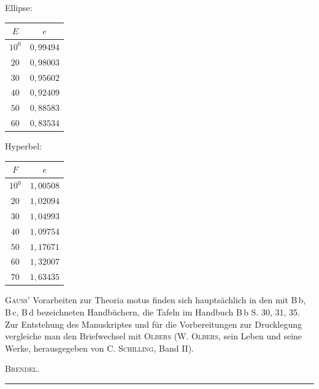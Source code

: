 \begin{center}
\begin{minipage}[t]{.42\linewidth}\centering
Ellipse:\par\smallskip
\begin{tabular}{c|c}
$E$ & $e$ \\
\hline
$10^0$ & $0{,}99494$ \\
$20$ & $0{,}98003$ \\
$30$ & $0{,}95602$ \\
$40$ & $0{,}92409$ \\
$50$ & $0{,}88583$ \\
$60$ & $0{,}83534$ \\
\end{tabular}
\end{minipage}\hfill
\begin{minipage}[t]{.42\linewidth}\centering
Hyperbel:\par\smallskip
\begin{tabular}{c|c}
$F$ & $e$ \\
\hline
$10^0$ & $1{,}00508$ \\
$20$ & $1{,}02094$ \\
$30$ & $1{,}04993$ \\
$40$ & $1{,}09754$ \\
$50$ & $1{,}17671$ \\
$60$ & $1{,}32007$ \\
$70$ & $1{,}63435$ \\
\end{tabular}
\end{minipage}
\end{center}
\textsc{Gauss}’ Vorarbeiten zur Theoria motus finden sich hauptsächlich in den mit B\,b, B\,c, B\,d bezeichneten Handbüchern, die Tafeln im Handbuch B\,b S. 30, 31, 35. Zur Entstehung des Manuskriptes und für die Vorbereitungen zur Drucklegung vergleiche man den Briefwechsel mit \textsc{Olbers} (W. \textsc{Olbers}, sein Leben und seine Werke, herausgegeben von C. \textsc{Schilling}, Band II).

\begin{flushright}
\textsc{Brendel}.
\end{flushright}

\begin{center}
\rule{0.3\linewidth}{0.4pt}
\end{center}
